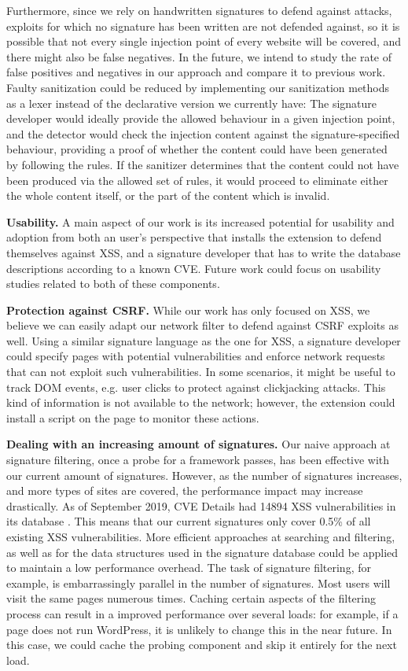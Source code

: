  Furthermore, since we rely on handwritten signatures to defend against attacks, exploits for which no signature has been written are not defended against, so it is possible that not every single injection point of every website will be covered, and there might also be false negatives. In the future, we intend to study the rate of false positives and negatives in our approach and compare it to previous work. Faulty sanitization could be reduced by implementing our sanitization methods as a lexer instead of the declarative version we currently have: The signature developer would ideally provide the allowed behaviour in a given injection point, and the detector would check the injection content against the signature-specified behaviour, providing a proof of whether the content could have been generated by following the rules. If the sanitizer determines that the content could not have been produced via the allowed set of rules, it would proceed to eliminate either the whole content itself, or the part of the content which is invalid.

\textbf{Usability.} A main aspect of our work is its increased potential for usability and adoption from both an user's perspective that installs the extension to defend themselves against XSS, and a signature developer that has to write the database descriptions according to a known CVE. Future work could focus on usability studies related to both of these components.

\textbf{Protection against CSRF.} While our work has only focused on XSS, we believe we can easily adapt our network filter to defend against CSRF exploits as well. Using a similar signature language as the one for XSS, a signature developer could specify pages with potential vulnerabilities and enforce network requests that can not exploit such vulnerabilities. In some scenarios, it might be useful to track DOM events, e.g. user clicks to protect against clickjacking attacks. This kind of information is not available to the network; however, the extension could install a script on the page to monitor these actions. 

\textbf{Dealing with an increasing amount of signatures.} Our naive approach at signature filtering, once a probe for a framework passes, has been effective with our current amount of signatures. However, as the number of signatures increases, and more types of sites are covered, the performance impact may increase drastically. As of September 2019, CVE Details had 14894 XSS vulnerabilities in its database \cite{vulnbytype}. This means that our current signatures only cover 0.5\% of all existing XSS vulnerabilities. More efficient approaches at searching and filtering, as well as for the data structures used in the signature database could be applied to maintain a low performance overhead. The task of signature filtering, for example, is embarrassingly parallel in the number of signatures. Most users will visit the same pages numerous times. Caching certain aspects of the filtering process can result in a improved performance over several loads: for example, if a page does not run WordPress, it is unlikely to change this in the near future. In this case, we could cache the probing component and skip it entirely for the next load.

